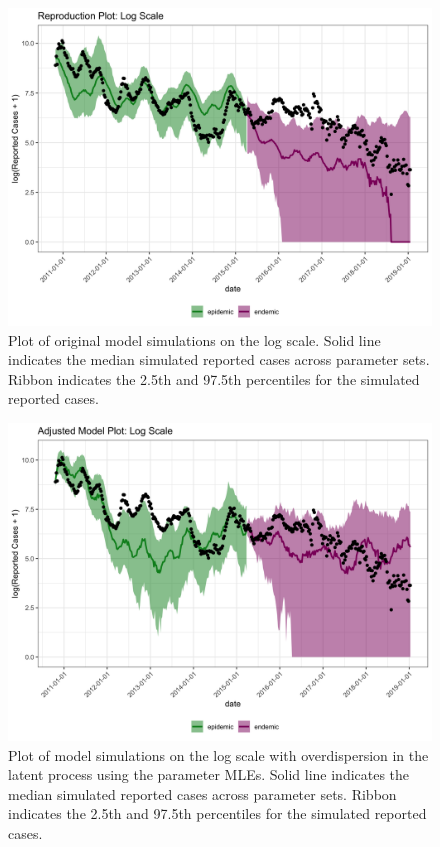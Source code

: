 \documentclass[12pt]{article}
\begin{document}
\begin{figure}[H]
  \centering
  \includegraphics[width=150mm]{reprod_plot_log.png}
  \caption{Plot of original model simulations on the log scale. Solid line indicates the median simulated reported cases across parameter sets. Ribbon indicates the 2.5th and 97.5th percentiles for the simulated reported cases.}
  \label{fig:A4}
\end{figure}

\begin{figure}[H]
  \centering
  \includegraphics[width=150mm]{mle_plot_adj_log.png}
  \caption{Plot of model simulations on the log scale with overdispersion in the latent process using the parameter MLEs. Solid line indicates the median simulated reported cases across parameter sets. Ribbon indicates the 2.5th and 97.5th percentiles for the simulated reported cases.}
  \label{fig:A5}
\end{figure}
\end{document}
